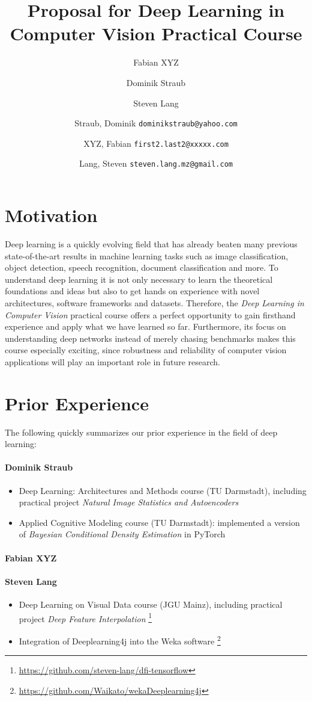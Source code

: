 \documentclass[11pt,english]{article}
\title{Proposal for Deep Learning in Computer Vision Practical Course}
\author{Fabian XYZ}
\author{Dominik Straub}
\author{Steven Lang}
\author{
	Straub, Dominik \texttt{dominikstraub@yahoo.com}
	\and
	XYZ, Fabian \texttt{first2.last2@xxxxx.com}
	\and
	Lang, Steven \texttt{steven.lang.mz@gmail.com}\\
}
\begin{document}
\maketitle
\section{Motivation}
Deep learning is a quickly evolving field that has already beaten many previous state-of-the-art results in machine learning tasks such as image classification, object detection, speech recognition, document classification and more. To understand deep learning it is not only necessary to learn the theoretical foundations and ideas but also to get hands on experience with novel architectures, software frameworks and datasets. Therefore, the \textit{Deep Learning in Computer Vision} practical course offers a perfect opportunity to gain firsthand experience and apply what we have learned so far. Furthermore, its focus on understanding deep networks instead of merely chasing benchmarks makes this course especially exciting, since robustness and reliability of computer vision applications will play an important role in future research.

\section{Prior Experience}
The following quickly summarizes our prior experience in the field of deep learning:

\paragraph{Dominik Straub}
\begin{itemize}
    \item Deep Learning: Architectures and Methods course (TU Darmstadt), including practical project \textit{Natural Image Statistics and Autoencoders}
    \item Applied Cognitive Modeling course (TU Darmstadt): implemented a version of \textit{Bayesian Conditional Density Estimation} \cite{Papamakarios2016} in PyTorch
\end{itemize}
\paragraph{Fabian XYZ}
\paragraph{Steven Lang}
\begin{itemize}
	\setlength\itemsep{-0.25em}
	\item Deep Learning on Visual Data course (JGU Mainz), including practical project \textit{Deep Feature Interpolation} \footnote{\url{https://github.com/steven-lang/dfi-tensorflow}}
	\item Integration of Deeplearning4j into the Weka software \footnote{\url{https://github.com/Waikato/wekaDeeplearning4j}}
\end{itemize}
\end{document}
